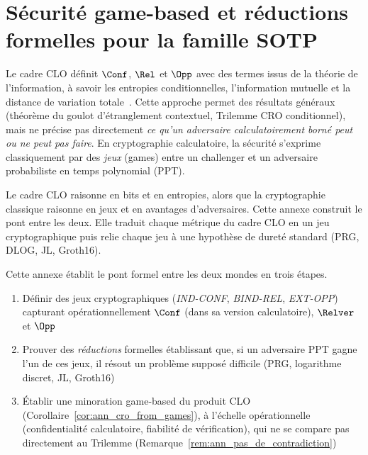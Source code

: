 
\chapter{S\'ecurit\'e game-based et r\'eductions formelles pour la famille SOTP}
\label{chap:annexe_gamebased}

\begin{sloppypar}
Le cadre CLO d\'efinit $\Conf$, $\Rel$ et $\Opp$ avec des termes issus de la théorie de l'information, \`a savoir les entropies conditionnelles, l'information
mutuelle et la distance de variation totale~\cite{MINKA2026CLO}. Cette approche
permet des r\'esultats g\'en\'eraux (th\'eor\`eme du goulot d'\'etranglement
contextuel, Trilemme CRO conditionnel), mais ne pr\'ecise pas directement
\emph{ce qu'un adversaire calculatoirement born\'e peut ou ne peut pas
faire}. En cryptographie calculatoire, la s\'ecurit\'e s'exprime
classiquement par des \emph{jeux} (games) entre un challenger et un
adversaire probabiliste en temps polynomial (PPT).

Le cadre CLO raisonne en bits et en entropies, alors que la cryptographie classique
raisonne en jeux et en avantages d'adversaires. Cette annexe construit
le pont entre les deux. Elle traduit chaque m\'etrique du cadre CLO
en un jeu cryptographique puis relie chaque jeu \`a une hypoth\`ese
de duret\'e standard (PRG, DLOG, JL, Groth16).

Cette annexe \'etablit le pont formel entre les deux mondes en trois \'etapes.
\begin{enumerate}
\item D\'efinir des jeux cryptographiques (\emph{IND-CONF},
      \emph{BIND-REL}, \emph{EXT-OPP}) capturant op\'erationnellement
      $\Conf$ (dans sa version calculatoire), $\Relver$ et $\Opp$
\item Prouver des \emph{r\'eductions} formelles \'etablissant que, si un adversaire PPT
      gagne l'un de ces jeux, il r\'esout un probl\`eme suppos\'e difficile
      (PRG, logarithme discret, JL, Groth16)
\item \'Etablir une minoration game-based du produit CLO
      (Corollaire~\ref{cor:ann_cro_from_games}), \`a l'\'echelle op\'erationnelle
      (confidentialit\'e calculatoire, fiabilit\'e de v\'erification), qui ne se
      compare pas directement au Trilemme
      (Remarque~\ref{rem:ann_pas_de_contradiction})
\end{enumerate}


\end{sloppypar}
